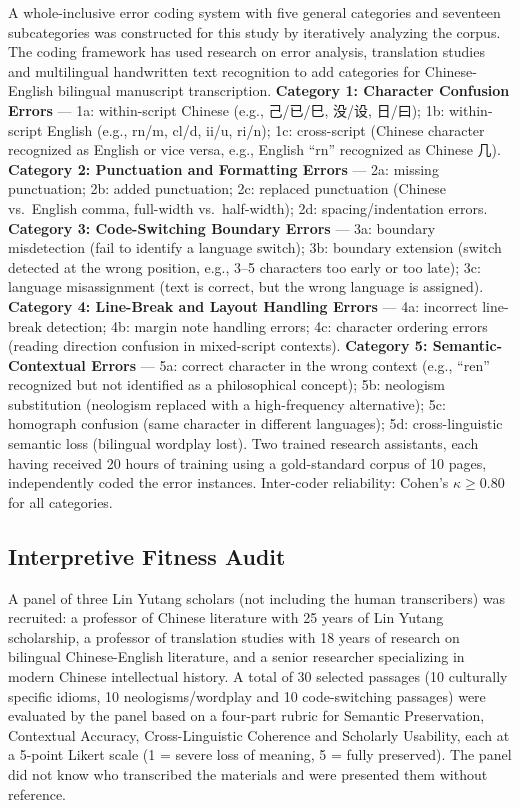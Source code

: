 \documentclass[final]{anthology-ch} %
\begin{document}
A whole-inclusive error coding system with five general categories and seventeen subcategories was constructed for this study by iteratively analyzing the corpus. The coding framework has used research on error analysis, translation studies and multilingual handwritten text recognition to add categories for Chinese-English bilingual manuscript transcription. \textbf{Category 1: Character Confusion Errors} --- 1a: within-script Chinese (e.g., 己/已/巳, 没/设, 日/曰); 1b: within-script English (e.g., rn/m, cl/d, ii/u, ri/n); 1c: cross-script (Chinese character recognized as English or vice versa, e.g., English \enquote{rn} recognized as Chinese 几). \textbf{Category 2: Punctuation and Formatting Errors} --- 2a: missing punctuation; 2b: added punctuation; 2c: replaced punctuation (Chinese vs.\ English comma, full-width vs.\ half-width); 2d: spacing/indentation errors. \textbf{Category 3: Code-Switching Boundary Errors} --- 3a: boundary misdetection (fail to identify a language switch); 3b: boundary extension (switch detected at the wrong position, e.g., 3--5 characters too early or too late); 3c: language misassignment (text is correct, but the wrong language is assigned). \textbf{Category 4: Line-Break and Layout Handling Errors} --- 4a: incorrect line-break detection; 4b: margin note handling errors; 4c: character ordering errors (reading direction confusion in mixed-script contexts). \textbf{Category 5: Semantic-Contextual Errors} --- 5a: correct character in the wrong context (e.g., \enquote{ren} recognized but not identified as a philosophical concept); 5b: neologism substitution (neologism replaced with a high-frequency alternative); 5c: homograph confusion (same character in different languages); 5d: cross-linguistic semantic loss (bilingual wordplay lost). Two trained research assistants, each having received 20 hours of training using a gold-standard corpus of 10 pages, independently coded the error instances. Inter-coder reliability: Cohen's $\kappa \geq 0.80$ for all categories.

\subsection{Interpretive Fitness Audit}

A panel of three Lin Yutang scholars (not including the human transcribers) was recruited: a professor of Chinese literature with 25 years of Lin Yutang scholarship, a professor of translation studies with 18 years of research on bilingual Chinese-English literature, and a senior researcher specializing in modern Chinese intellectual history. A total of 30 selected passages (10 culturally specific idioms, 10 neologisms/wordplay and 10 code-switching passages) were evaluated by the panel based on a four-part rubric for Semantic Preservation, Contextual Accuracy, Cross-Linguistic Coherence and Scholarly Usability, each at a 5-point Likert scale (1 = severe loss of meaning, 5 = fully preserved). The panel did not know who transcribed the materials and were presented them without reference.
\end{document}
